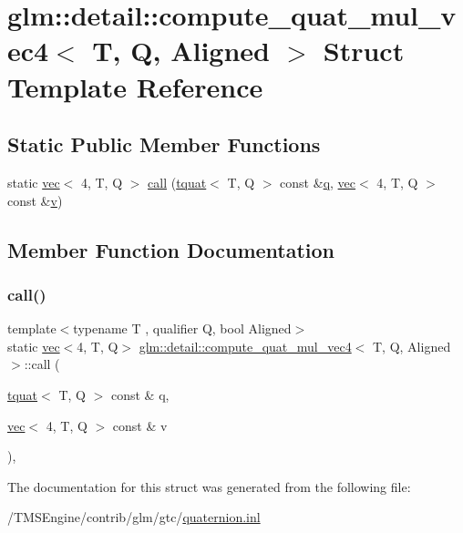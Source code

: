 \hypertarget{structglm_1_1detail_1_1compute__quat__mul__vec4}{}\section{glm\+:\+:detail\+:\+:compute\+\_\+quat\+\_\+mul\+\_\+vec4$<$ T, Q, Aligned $>$ Struct Template Reference}
\label{structglm_1_1detail_1_1compute__quat__mul__vec4}
\subsection*{Static Public Member Functions}
\begin{DoxyCompactItemize}
\item 
static \hyperlink{structglm_1_1vec}{vec}$<$ 4, T, Q $>$ \hyperlink{structglm_1_1detail_1_1compute__quat__mul__vec4_a5482b25b24a73e5a7a522f771e0045b0}{call} (\hyperlink{structglm_1_1tquat}{tquat}$<$ T, Q $>$ const \&\hyperlink{_s_d_l__opengl_8h_a8fc1e7b9baaae687804c7eed46ca09c6}{q}, \hyperlink{structglm_1_1vec}{vec}$<$ 4, T, Q $>$ const \&\hyperlink{_s_d_l__opengl_8h_a10a82eabcb59d2fcd74acee063775f90}{v})
\end{DoxyCompactItemize}


\subsection{Member Function Documentation}
\mbox{\label{structglm_1_1detail_1_1compute__quat__mul__vec4_a5482b25b24a73e5a7a522f771e0045b0}} 
\subsubsection{\texorpdfstring{call()}{call()}}
{\footnotesize\ttfamily template$<$typename T , qualifier Q, bool Aligned$>$ \\
static \hyperlink{structglm_1_1vec}{vec}$<$4, T, Q$>$ \hyperlink{structglm_1_1detail_1_1compute__quat__mul__vec4}{glm\+::detail\+::compute\+\_\+quat\+\_\+mul\+\_\+vec4}$<$ T, Q, Aligned $>$\+::call (\begin{DoxyParamCaption}\item[{\hyperlink{structglm_1_1tquat}{tquat}$<$ T, Q $>$ const \&}]{q,  }\item[{\hyperlink{structglm_1_1vec}{vec}$<$ 4, T, Q $>$ const \&}]{v }\end{DoxyParamCaption})\hspace{0.3cm}{\ttfamily [inline]}, {\ttfamily [static]}}



The documentation for this struct was generated from the following file\+:\begin{DoxyCompactItemize}
\item 
/\+T\+M\+S\+Engine/contrib/glm/gtc/\hyperlink{gtc_2quaternion_8inl}{quaternion.\+inl}\end{DoxyCompactItemize}
